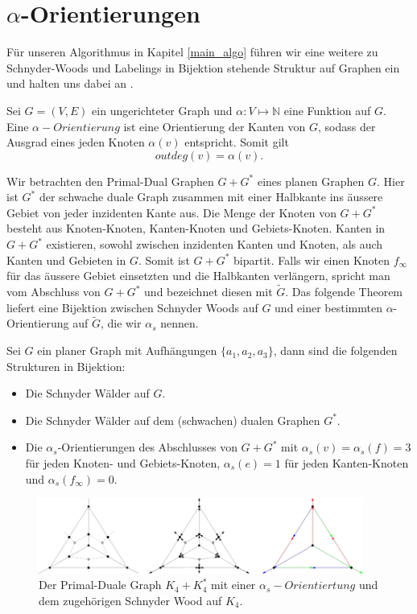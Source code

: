 \section{$\alpha$-Orientierungen}\label{alpha_orientations}

Für unseren Algorithmus in Kapitel \ref{main_algo} führen wir eine weitere zu Schnyder-Woods und Labelings in Bijektion stehende Struktur auf Graphen ein und halten uns dabei an \cite{felsner04}.

Sei $G=(V,E)$ ein ungerichteter Graph und $\alpha:V\mapsto\mathbb{N}$ eine Funktion auf $G$. Eine $\alpha-Orientierung$ ist eine Orientierung der Kanten von $G$, sodass der Ausgrad eines jeden Knoten $\alpha(v)$ entspricht. Somit gilt $$outdeg(v) = \alpha(v).$$

Wir betrachten den Primal-Dual Graphen $G+G^*$ eines planen Graphen $G$. Hier ist $G^*$ der schwache duale Graph zusammen mit einer Halbkante ins äussere Gebiet von jeder inzidenten Kante aus. Die Menge der Knoten von $G+G^*$ besteht aus Knoten-Knoten, Kanten-Knoten und Gebiets-Knoten. Kanten in $G+G^*$ existieren, sowohl zwischen inzidenten Kanten und Knoten, als auch Kanten und Gebieten in $G$. Somit ist $G+G^*$ bipartit. Falls wir einen Knoten $f_\infty$ für das äussere Gebiet einsetzten und die Halbkanten verlängern, spricht man vom Abschluss von $G+G^*$ und bezeichnet diesen mit $\tilde{G}$. Das folgende Theorem liefert eine Bijektion zwischen Schnyder Woods auf $G$ und einer bestimmten $\alpha$-Orientierung auf $\tilde{G}$, die wir $\alpha_s$ nennen.

\begin{theorem}\label{alpha_bij}
Sei $G$ ein planer Graph mit Aufhängungen $\{a_1,a_2,a_3\}$, dann sind die folgenden Strukturen in Bijektion:
\begin{itemize}
\item Die Schnyder Wälder auf $G$.
\item Die Schnyder Wälder auf dem (schwachen) dualen Graphen $G^*$.
\item Die $\alpha_{s}$-Orientierungen des Abschlusses von $G+G^*$ mit $\alpha_s(v) = \alpha_s(f) = 3$ für jeden Knoten- und Gebiets-Knoten,  $\alpha_s(e) = 1$ für jeden Kanten-Knoten und  $\alpha_s(f_\infty) = 0$.
\end{itemize}
\end{theorem}

\begin{figure}[h]
	\centering
  \includegraphics[width=0.95\textwidth]{alpha_ex.png}
  \caption{Der Primal-Duale Graph $K_4+K_4^*$ mit einer $\alpha_s-Orientiertung$ und dem zugehörigen Schnyder Wood auf $K_4$. }
\end{figure}